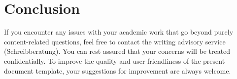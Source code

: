 
\chapter{Conclusion}
If you encounter any issues with your academic work that go beyond purely content-related questions, feel free to contact the writing advisory service (Schreibberatung). You can rest assured that your concerns will be treated confidentially.
To improve the quality and user-friendliness of the present document template, your suggestions for improvement are always welcome.
